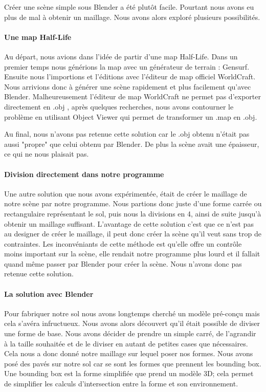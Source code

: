\documentclass[a4paper,12pt]{report}
\begin{document}
Créer une scène simple sous Blender a été plutôt facile. Pourtant nous avons eu plus de mal à obtenir un maillage. Nous avons alors exploré plusieurs possibilités.

\paragraph{Une map Half-Life}

Au départ, nous avions dans l'idée de partir d'une map Half-Life. Dans un premier temps nous générions la map avec un générateur de terrain : Gensurf. Ensuite nous l'importions et l'éditions avec l'éditeur de map officiel WorldCraft. Nous arrivions donc à générer une scène rapidement et plus facilement qu'avec Blender. 
Malheureusement l'éditeur de map WorldCraft ne permet pas d'exporter directement en .obj , après quelques recherches, nous avons contourner le problème en utilisant Object Viewer qui permet de transformer un .map en .obj.

Au final, nous n'avons pas retenue cette solution car le .obj obtenu n'était pas aussi "propre" que celui obtenu par Blender. De plus la scène avait une épaisseur, ce qui ne nous plaisait pas.

\paragraph{Division directement dans notre programme}

Une autre solution que nous avons expérimentée, était de créer le maillage de notre scène par notre programme. Nous partions donc juste d'une forme carrée ou rectangulaire représentant le sol, puis nous la divisions en 4, ainsi de suite jusqu'à obtenir un maillage suffisant.
L'avantage de cette solution c'est que ce n'est pas au designer de créer le maillage, il peut donc créer la scène qu'il veut sans trop de contraintes. Les inconvéniants de cette méthode est qu'elle offre un contrôle moins important sur la scène, elle rendait notre programme plus lourd et il fallait quand même passer par Blender pour créer la scène. Nous n'avons donc pas retenue cette solution.

\paragraph{La solution avec Blender}

Pour fabriquer notre sol nous avons longtemps cherché un modèle pré-conçu mais cela s'avéra infructueux.
Nous avons alors découvert qu'il était possible de diviser une forme de base. Nous avons décider de prendre un simple carré, de l'agrandir à la taille souhaitée et de le diviser en autant de petites cases que nécessaires. Cela nous a donc donné notre maillage sur lequel poser nos formes.
Nous avons posé des pavés sur notre sol car se sont les formes que prennent les bounding box. Une bounding box est la forme simplifiée que prend un modèle 3D; cela permet de simplifier les calculs d'intersection entre la forme et son environnement.
\end{document}
